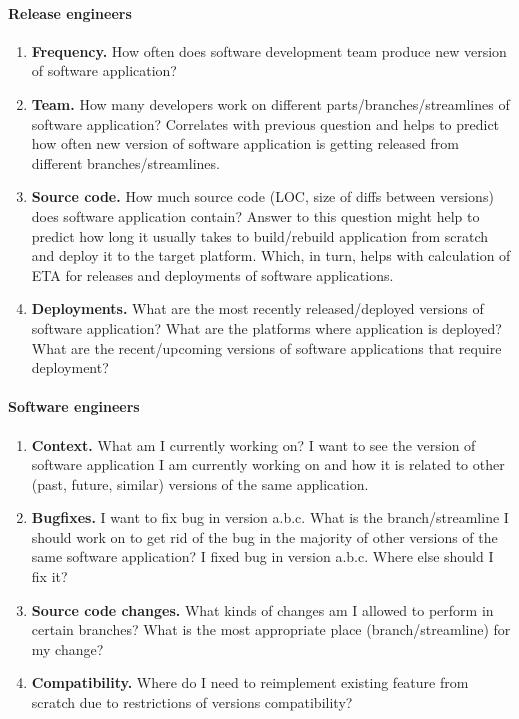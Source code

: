 \documentclass[journal]{vgtc}                %
\begin{document}
\paragraph{Release engineers}
	\begin{enumerate}
		\item \textbf{Frequency.} How often does software development team produce new version of software application? 
		\item \textbf{Team.} How many developers work on different parts/branches/streamlines of software application? Correlates with previous question and helps to predict how often new version of software application is getting released from different branches/streamlines.
		\item \textbf{Source code.} How much source code (LOC, size of diffs between versions) does software application contain? Answer to this question might help to predict how long it usually takes to build/rebuild application from scratch and deploy it to the target platform. Which, in turn, helps with calculation of ETA for releases and deployments of software applications.
		\item \textbf{Deployments.} What are the most recently released/deployed versions of software application? What are the platforms where application is deployed? What are the recent/upcoming versions of software applications that require deployment? 
	\end{enumerate}

\paragraph{Software engineers}
\begin{enumerate}
	\item \textbf{Context.} What am I currently working on? I want to see the version of software application I am currently working on and how it is related to other (past, future, similar) versions of the same application.
	\item \textbf{Bugfixes.} I want to fix bug in version a.b.c. What is the branch/streamline I should work on to get rid of the bug in the majority of other versions of the same software application? I fixed bug in version a.b.c. Where else should I fix it? 
	\item \textbf{Source code changes.} What kinds of changes am I allowed to perform in certain branches? What is the most appropriate place (branch/streamline) for my change?
	\item \textbf{Compatibility.} Where do I need to reimplement existing feature from scratch due to restrictions of versions compatibility?
\end{enumerate}
\end{document}
